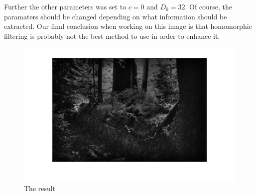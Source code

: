 \documentclass[a4paper]{article}
\begin{document}
		Further the other parameters was set to $c = 0$ and $D_0 = 32$. Of course,
		the paramaters should be changed depending on what information should be extracted.
		Our final conclusion when working on this image is that homomorphic filtering
		is probably not the best method to use in order to enhance it.
		\begin{figure}[h!]
			\includegraphics{../pics/resulting_image.png}
			\caption{The result}
			\label{fig:result}		
		\end{figure}
							    
\end{document}
